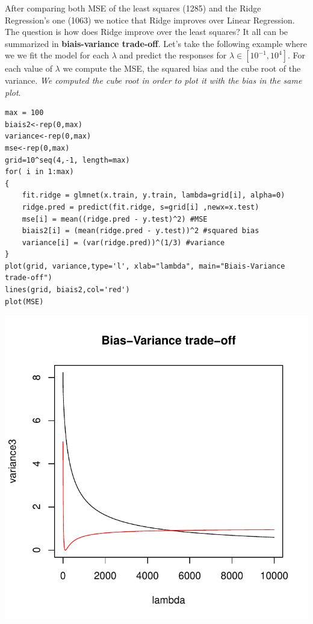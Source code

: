 \documentclass[]{report}
\begin{document}
After comparing both MSE of the least squares (1285) and the Ridge Regression's one (1063) we notice that Ridge improves over Linear Regression. 
The question is how does Ridge improve over the least squares? It all can be summarized in\textbf{ biais-variance trade-off}. Let's take the following example where we we fit the model for each $\lambda$ and predict the responses for $\lambda\in[10^{-1},10^{4}]$. For each value of $\lambda$ we compute the MSE, the squared bias and the cube root of the variance. \textit{We computed the cube root in order to plot it with the bias in the same plot}.
\begin{lstlisting}
max = 100
biais2<-rep(0,max)
variance<-rep(0,max) 
mse<-rep(0,max)
grid=10^seq(4,-1, length=max)
for( i in 1:max)
{     
	fit.ridge = glmnet(x.train, y.train, lambda=grid[i], alpha=0)
	ridge.pred = predict(fit.ridge, s=grid[i] ,newx=x.test)
	mse[i] = mean((ridge.pred - y.test)^2) #MSE
	biais2[i] = (mean(ridge.pred - y.test))^2 #squared bias
	variance[i] = (var(ridge.pred))^(1/3) #variance
}
plot(grid, variance,type='l', xlab="lambda", main="Biais-Variance trade-off")
lines(grid, biais2,col='red')
plot(MSE)
\end{lstlisting}

\begin{center}
	\includegraphics[width=0.8\linewidth]{Figures/ridge_bias_var.pdf}
\end{center}
\end{document}
